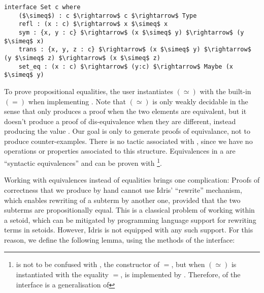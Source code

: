 \begin{lstlisting}
interface Set c where
    ($\simeq$) : c $\rightarrow$ c $\rightarrow$ Type
    refl : (x : c) $\rightarrow$ x $\simeq$ x
    sym : {x, y : c} $\rightarrow$ (x $\simeq$ y) $\rightarrow$ (y $\simeq$ x)
    trans : {x, y, z : c} $\rightarrow$ (x $\simeq$ y) $\rightarrow$ (y $\simeq$ z) $\rightarrow$ (x $\simeq$ z)    
    set_eq : (x : c) $\rightarrow$ (y:c) $\rightarrow$ Maybe (x $\simeq$ y)
\end{lstlisting}

To prove propositional equalities, the user instantiates
$(\simeq)$ with the built-in $(=)$ when implementing .
Note that $(\simeq)$ is only weakly decidable in the sense
that  only produces a proof when the two elements are equivalent,
but it doesn't produce a proof of dis-equivalence when they are different,
instead producing the value . Our goal is only to generate
proofs of equivalance, not to produce counter-examples.
%
There is no tactic associated with , since we have no operations or
properties associated to this structure. Equivalences in a
 are ``syntactic equivalences'' and can be
proven with \footnote{ is not to be confused with
, the constructor of $=$, but when $(\simeq)$ is
instantiated with the equality $=$,  is implemented by
. Therefore,  of the interface  is a
generalisation of }.


Working with equivalences instead of equalities brings one complication: Proofs
of correctness that we produce by hand cannot use Idris' ``rewrite'' mechanism,
which enables rewriting of a subterm by another one, provided that the two
subterms are propositionally equal. 
%
%
This is a classical problem of
working within a setoid, which can be mitigated by programming
language support for rewriting terms in setoids. However, Idris
is not equipped with any such support. For this reason, we define the 
following lemma, using the methods of the  interface:

